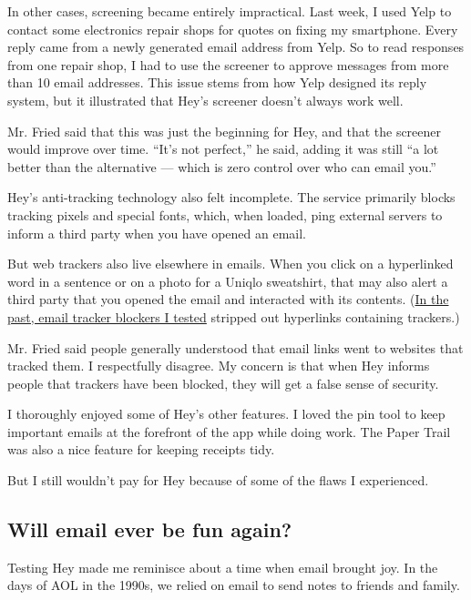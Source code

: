In other cases, screening became entirely impractical. Last week, I used
Yelp to contact some electronics repair shops for quotes on fixing my
smartphone. Every reply came from a newly generated email address from
Yelp. So to read responses from one repair shop, I had to use the
screener to approve messages from more than 10 email addresses. This
issue stems from how Yelp designed its reply system, but it illustrated
that Hey's screener doesn't always work well.

Mr. Fried said that this was just the beginning for Hey, and that the
screener would improve over time. ``It's not perfect,'' he said, adding
it was still ``a lot better than the alternative --- which is zero
control over who can email you.''

Hey's anti-tracking technology also felt incomplete. The service
primarily blocks tracking pixels and special fonts, which, when loaded,
ping external servers to inform a third party when you have opened an
email.

But web trackers also live elsewhere in emails. When you click on a
hyperlinked word in a sentence or on a photo for a Uniqlo sweatshirt,
that may also alert a third party that you opened the email and
interacted with its contents.
(\href{https://www.nytimes3xbfgragh.onion/2015/11/19/technology/personaltech/foiling-electronic-snoops-in-email.html}{In
the past, email tracker blockers I tested} stripped out hyperlinks
containing trackers.)

Mr. Fried said people generally understood that email links went to
websites that tracked them. I respectfully disagree. My concern is that
when Hey informs people that trackers have been blocked, they will get a
false sense of security.

I thoroughly enjoyed some of Hey's other features. I loved the pin tool
to keep important emails at the forefront of the app while doing work.
The Paper Trail was also a nice feature for keeping receipts tidy.

But I still wouldn't pay for Hey because of some of the flaws I
experienced.

\hypertarget{will-email-ever-be-fun-again}{%
\subsection{Will email ever be fun
again?}\label{will-email-ever-be-fun-again}}

Testing Hey made me reminisce about a time when email brought joy. In
the days of AOL in the 1990s, we relied on email to send notes to
friends and family.


